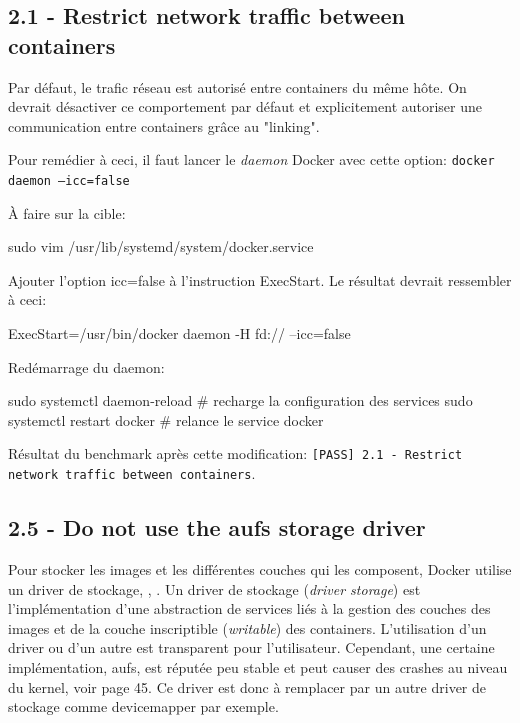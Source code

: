 \documentclass[11pt,a4paper,oneside]{report}
\newcommand{\code}[1]{\texttt{#1}}
\begin{document}
\subsection{2.1  - Restrict network traffic between containers}
Par défaut, le trafic réseau est autorisé entre containers du même hôte. On devrait désactiver ce comportement par défaut et explicitement autoriser une communication entre containers grâce au "linking".

Pour remédier à ceci, il faut lancer le \textit{daemon} Docker avec cette option: \code{docker daemon --icc=false}

À faire sur la cible:

\begin{bashcode}
sudo vim /usr/lib/systemd/system/docker.service
\end{bashcode}

Ajouter l'option icc=false à l'instruction ExecStart. Le résultat devrait ressembler à ceci:

\begin{bashcode}
ExecStart=/usr/bin/docker daemon -H fd:// --icc=false
\end{bashcode}

Redémarrage du daemon:

\begin{bashcode}
sudo systemctl daemon-reload # recharge la configuration des services
sudo systemctl restart docker # relance le service docker
\end{bashcode}

Résultat du benchmark après cette modification: \code{[PASS] 2.1 - Restrict network traffic between containers}.

\subsection{2.5 - Do not use the aufs storage driver}
Pour stocker les images et les différentes couches qui les composent, Docker utilise un driver de stockage\cite{understanding_image_container_driver_storage}, \cite{docker_select_a_driver}, \cite{jpetazzoni_device_driver}. Un driver de stockage (\textit{driver storage}) est l'implémentation d'une abstraction de services liés à la gestion des couches des images et de la couche inscriptible (\textit{writable}) des containers. L'utilisation d'un driver ou d'un autre est transparent pour l'utilisateur. Cependant, une certaine implémentation, aufs, est réputée peu stable et peut causer des crashes au niveau du kernel, voir \cite{cis_benchmark} page 45. Ce driver est donc à remplacer par un autre driver de stockage comme devicemapper par exemple.
\end{document}
